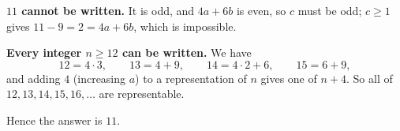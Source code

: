 \textbf{$11$ cannot be written.} It is odd, and $4a+6b$ is even, so $c$ must be odd; $c\ge1$ gives $11-9=2=4a+6b$, which is impossible.

\textbf{Every integer $n\ge12$ can be written.} We have
\[
12=4\cdot3,\qquad 13=4+9,\qquad 14=4\cdot2+6,\qquad 15=6+9,
\]
and adding $4$ (increasing $a$) to a representation of $n$ gives one of $n+4$. So all of $12,13,14,15,16,\dots$ are representable.

Hence the answer is $\boxed{11}$.

